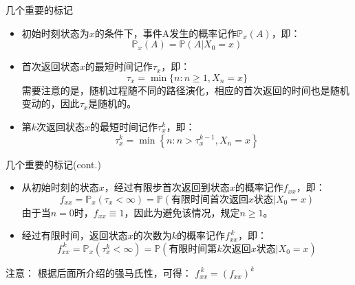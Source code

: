 \documentclass[t]{beamer}
\renewcommand{\Pr}{\mathbb{P}}
\begin{document}
\begin{frame}{几个重要的标记}
    \begin{itemize}
        \item 初始时刻状态为$x$的条件下，事件A发生的概率记作$\Pr_x(A)$，即：
        \begin{equation*}
        \Pr_x(A)=\Pr(A|X_0=x)
        \end{equation*}
        
        \item 首次返回状态$x$的最短时间记作$\tau_x$，即：
        \begin{equation*}
        \tau_x=\min\{n: n\ge 1, X_n=x \}
        \end{equation*}
        需要注意的是，随机过程随不同的路径演化，相应的首次返回的时间也是随机变动的，因此$\tau_x$是随机的。
        
        \item  第$k$次返回状态$x$的最短时间记作$\tau^k_x$，即：
        \begin{equation*}
        \tau^k_x=\min\left\{n:n>\tau^{k-1}_x, X_n=x \right\}
        \end{equation*}
    \end{itemize}

    \end{frame}


    \begin{frame}{几个重要的标记(cont.)}
        \begin{itemize} 
        \item  从初始时刻的状态$x$，经过有限步{首次返回}到状态$x$的概率记作$f_{xx}$，即：
        \begin{equation*}
        f_{xx}=\Pr_x(\tau_x<\infty)=\Pr(\text{有限时间首次返回$x$状态}|X_0=x)
        \end{equation*}
        由于当$n=0$时，$f_{xx}\equiv 1$，因此为避免该情况，规定$n\ge 1$。
        
        \item  经过有限时间，返回状态$x$的次数为$k$的概率记作$f_{xx}^{\,k}$，即：
        \begin{equation*}
        f_{xx}^{\,k}=\Pr_x(\tau^k_x<\infty)=\Pr(\text{有限时间第$k$次返回$x$状态}|X_0=x)
        \end{equation*}
    \end{itemize}
    
    \begin{block}{注意：}
       根据后面所介绍的强马氏性，可得： $f^{\,k}_{xx}=(f_{xx})^k$
    \end{block}
\end{frame}
\end{document}

